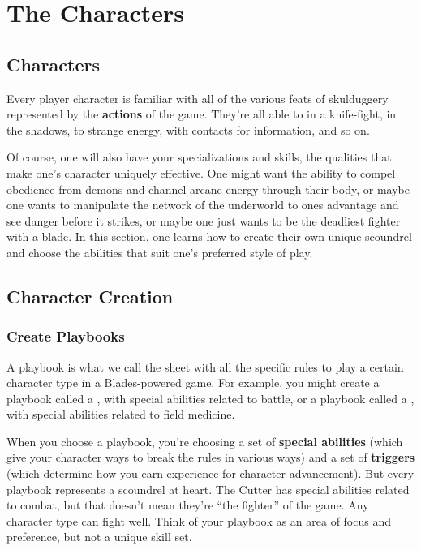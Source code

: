 \chapter{The Characters}

\section{Characters}

Every player character is familiar with all of the various feats of skulduggery represented by the \textbf{actions} of the game. They’re all able to  in a knife-fight,  in the shadows,  to strange energy,  with contacts for information, and so on.

Of course, one will also have your specializations and skills, the qualities that make one's character uniquely effective. One might want the ability to compel obedience from demons and channel arcane energy through their body, or maybe one wants to manipulate the network of the underworld to ones advantage and see danger before it strikes, or maybe one just wants to be the deadliest fighter with a blade. In this section, one learns how to create their own unique scoundrel and choose the abilities that suit one's preferred style of play.

\section{Character Creation}

\subsection{Create Playbooks}

A playbook is what we call the sheet with all the specific rules to play a certain character type in a Blades-powered game. For example, you might create a playbook called a , with special abilities related to battle, or a playbook called a , with special abilities related to field medicine.

When you choose a playbook, you’re choosing a set of \textbf{special abilities} (which give your character ways to break the rules in various ways) and a set of  \textbf{triggers} (which determine how you earn experience for character advancement). But every playbook represents a scoundrel at heart. The Cutter has special abilities related to combat, but that doesn’t mean they’re ``the fighter'' of the game. Any character type can fight well. Think of your playbook as an area of focus and preference, but not a unique skill set.

